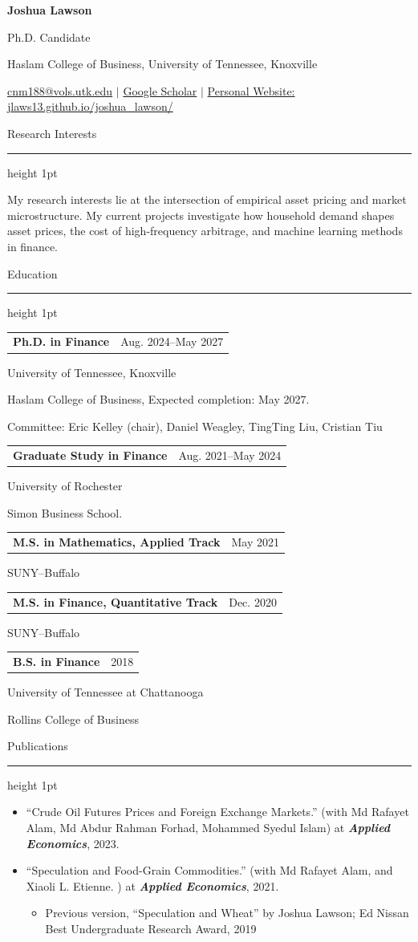 \documentclass[11pt,letterpaper]{article}
\makeatletter
\newcommand{\cvsection}[1]{%
  \vspace{7.5pt}%
  {\large\color{accent}#1}\par
  \vspace{1.5pt}%
  {\color{accent}\hrule height 1pt}%
  \vspace{2pt}%
}
\newcommand{\datedentry}[2]{%
  \begin{tabular*}{\textwidth}{@{\extracolsep{\fill}}l r}
    \textbf{#1} & {\color{dategray}#2}
  \end{tabular*}\par
}
\makeatother
\begin{document}
{\fontsize{24}{27}\selectfont\textbf{Joshua Lawson}}\par
{\large Ph.D. Candidate}\par
{\large Haslam College of Business, University of Tennessee, Knoxville}\par
\vspace{2pt}
\href{mailto:cnm188@vols.utk.edu}{cnm188@vols.utk.edu}
\quad $|$ \quad
\href{https://scholar.google.com/citations?user=wVeYQeAAAAAJ\&hl=en}{Google Scholar}
\quad $|$ \quad
\href{https://jlaws13.github.io/joshua_lawson/}{Personal Website: jlaws13.github.io/joshua\_lawson/}

\vspace{5pt}

\cvsection{Research Interests}
My research interests lie at the intersection of empirical asset pricing and market microstructure. My current projects investigate how household demand shapes asset prices, the cost of high-frequency arbitrage, and machine learning methods in finance.

\vspace{5pt}

\cvsection{Education}
\datedentry{Ph.D. in Finance}{Aug. 2024--May 2027}
University of Tennessee, Knoxville\par
Haslam College of Business, Expected completion: May 2027.\par
Committee: Eric Kelley (chair), Daniel Weagley, TingTing Liu, Cristian Tiu
\vspace{3pt}

\datedentry{Graduate Study in Finance}{Aug. 2021--May 2024}
University of Rochester\par
Simon Business School.\par
\vspace{3pt}

\datedentry{M.S. in Mathematics, Applied Track}{May 2021}
SUNY--Buffalo
\vspace{3pt}

\datedentry{M.S. in Finance, Quantitative Track}{Dec. 2020}
SUNY--Buffalo
\vspace{3pt}

\datedentry{B.S. in Finance}{2018}
University of Tennessee at Chattanooga\par
Rollins College of Business

\cvsection{Publications}
\begin{itemize}
  \item ``Crude Oil Futures Prices and Foreign Exchange Markets.'' (with Md Rafayet Alam, Md Abdur Rahman Forhad, Mohammed Syedul Islam) at \textbf{\textit{Applied Economics}}, 2023.
  \item ``Speculation and Food-Grain Commodities.'' (with Md Rafayet Alam, and Xiaoli L. Etienne. ) at \textbf{\textit{Applied Economics}}, 2021.
    \begin{itemize}[label=\(\circ\)]
      \item Previous version, ``Speculation and Wheat'' by Joshua Lawson; Ed Nissan Best Undergraduate Research Award, 2019
    \end{itemize}
\end{itemize}
\end{document}
